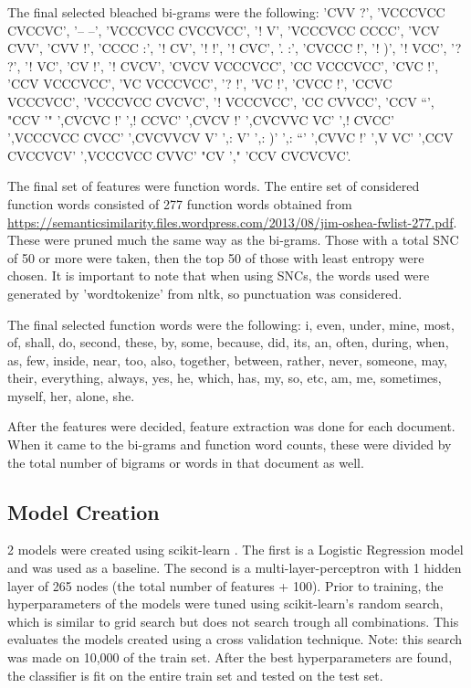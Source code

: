 The final selected bleached bi-grams were the following: 'CVV ?', 'VCCCVCC CVCCVC', '-- --', 'VCCCVCC CVCCVCC', '! V', 'VCCCVCC CCCC', 'VCV CVV', 'CVV !', 'CCCC :', '! CV', '! !', '! CVC', '. :', 'CVCCC !', '! )', '! VCC', '? ?', '! VC', 'CV !', '! CVCV', 'CVCV VCCCVCC', 'CC VCCCVCC', 'CVC !', 'CCV VCCCVCC', 'VC VCCCVCC', '? !', 'VC !', 'CVCC !', 'CCVC VCCCVCC', 'VCCCVCC CVCVC', '! VCCCVCC', 'CC CVVCC', 'CCV ``', "CCV '" ',CVCVC !' ',! CCVC' ',CVCV !' ',CVCVVC VC' ',! CVCC' ',VCCCVCC CVCC' ',CVCVVCV V' ',: V' ',: )' ',: ``' ',CVVC !' ',V VC' ',CCV CVCCVCV' ',VCCCVCC CVVC' "CV '," 'CCV CVCVCVC'.

The final set of features were function words. The entire set of considered function words consisted of 277 function words obtained from \url{https://semanticsimilarity.files.wordpress.com/2013/08/jim-oshea-fwlist-277.pdf}. These were pruned much the same way as the bi-grams. Those with a total SNC of 50 or more were taken, then the top 50 of those with least entropy were chosen. It is important to note that when using SNCs, the words used were generated by 'word\textunderscore tokenize' from nltk, so punctuation was considered.

The final selected function words were the following: i, even, under, mine, most, of, shall, do, second, these, by, some, because, did, its, an, often, during, when, as, few, inside, near, too, also, together, between, rather, never, someone, may, their, everything, always, yes, he, which, has, my, so, etc, am, me, sometimes, myself, her, alone, she.

After the features were decided, feature extraction was done for each document. When it came to the bi-grams and function word counts, these were divided by the total number of bigrams or words in that document as well. 

\subsection{Model Creation}
2 models were created using scikit-learn \cite{scikit-learn}. The first is a Logistic Regression model and was used as a baseline. The second is a multi-layer-perceptron with 1 hidden layer of 265 nodes (the total number of features + 100). Prior to training, the hyperparameters of the models were tuned using scikit-learn's random search, which is similar to grid search but does not search trough all combinations. This evaluates the models created using a cross validation technique. Note: this search was made on 10,000 of the train set. After the best hyperparameters are found, the classifier is fit on the entire train set and tested on the test set.